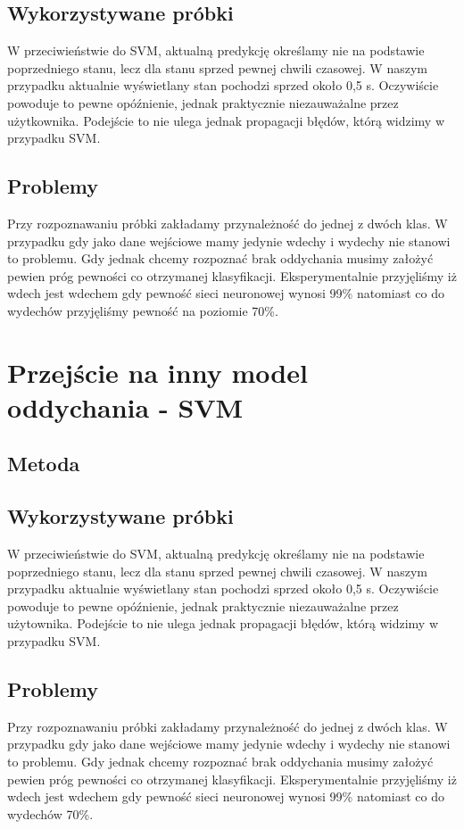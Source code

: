 \documentclass[polish]{article}
\begin{document}
\subsection{Wykorzystywane próbki}
W przeciwieństwie do SVM, aktualną predykcję określamy nie na podstawie poprzedniego stanu, lecz dla stanu sprzed pewnej chwili czasowej. W naszym przypadku aktualnie wyświetlany stan pochodzi sprzed około 0,5 s. Oczywiście powoduje to pewne opóźnienie, jednak praktycznie niezauważalne przez użytkownika. Podejście to nie ulega jednak propagacji błędów, którą widzimy w przypadku SVM.
\subsection{Problemy}
Przy rozpoznawaniu próbki zakładamy przynależność do jednej z dwóch klas. W przypadku gdy jako dane wejściowe mamy jedynie wdechy i wydechy nie stanowi to problemu. Gdy jednak chcemy rozpoznać brak oddychania musimy założyć pewien próg pewności co otrzymanej klasyfikacji. Eksperymentalnie przyjęliśmy iż wdech jest wdechem gdy pewność sieci neuronowej wynosi 99\% natomiast co do wydechów przyjęliśmy pewność na poziomie 70\%. 
\section{Przejście na inny model oddychania - SVM}
\subsection{Metoda}
\subsection{Wykorzystywane próbki}
W przeciwieństwie do SVM, aktualną predykcję określamy nie na podstawie poprzedniego stanu, lecz dla stanu sprzed pewnej chwili czasowej. W naszym przypadku aktualnie wyświetlany stan pochodzi sprzed około 0,5 s. Oczywiście powoduje to pewne opóźnienie, jednak praktycznie niezauważalne przez użytownika. Podejście to nie ulega jednak propagacji błędów, którą widzimy w przypadku SVM.
\subsection{Problemy}
Przy rozpoznawaniu próbki zakładamy przynależność do jednej z dwóch klas. W przypadku gdy jako dane wejściowe mamy jedynie wdechy i wydechy nie stanowi to problemu. Gdy jednak chcemy rozpoznać brak oddychania musimy założyć pewien próg pewności co otrzymanej klasyfikacji. Eksperymentalnie przyjęliśmy iż wdech jest wdechem gdy pewność sieci neuronowej wynosi 99\% natomiast co do wydechów 70\%. 
\end{document}
